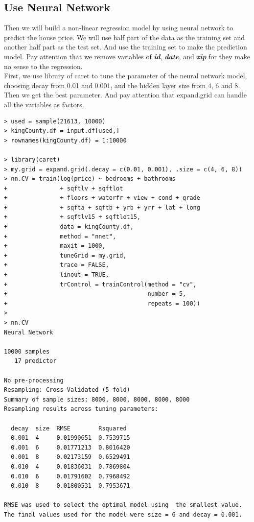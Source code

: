 \documentclass{article}%
\begin{document}
\subsection{Use Neural Network}
Then we will build a non-linear regression model by using neural network to predict the house price. We will use half part of the data as the training set and another half part as the test set. And use the training set to make the prediction model. Pay attention that we remove variables of  \emph{\textbf{id}},  \emph{\textbf{date}},  and \emph{\textbf{zip}} for they make no sense to the regression.\\
\indent First, we use library of caret to tune the parameter of the neural network model, choosing decay from 0.01 and 0.001, and the hidden layer size from 4, 6 and 8. Then we get the best parameter. And pay attention that expand.grid can handle all the variables as factors.
\begin{verbatim}
> used = sample(21613, 10000)
> kingCounty.df = input.df[used,]
> rownames(kingCounty.df) = 1:10000

> library(caret)
> my.grid = expand.grid(.decay = c(0.01, 0.001), .size = c(4, 6, 8))
> nn.CV = train(log(price) ~ bedrooms + bathrooms
+               + sqftlv + sqftlot
+               + floors + waterfr + view + cond + grade
+               + sqfta + sqftb + yrb + yrr + lat + long
+               + sqftlv15 + sqftlot15,
+               data = kingCounty.df,
+               method = "nnet",
+               maxit = 1000,
+               tuneGrid = my.grid,
+               trace = FALSE,
+               linout = TRUE,
+               trControl = trainControl(method = "cv",
+                                        number = 5,
+                                        repeats = 100))
>
> nn.CV
Neural Network

10000 samples
   17 predictor

No pre-processing
Resampling: Cross-Validated (5 fold)
Summary of sample sizes: 8000, 8000, 8000, 8000, 8000
Resampling results across tuning parameters:

  decay  size  RMSE        Rsquared
  0.001  4     0.01990651  0.7539715
  0.001  6     0.01771213  0.8016420
  0.001  8     0.02173159  0.6529491
  0.010  4     0.01836031  0.7869804
  0.010  6     0.01791602  0.7968492
  0.010  8     0.01800531  0.7953671

RMSE was used to select the optimal model using  the smallest value.
The final values used for the model were size = 6 and decay = 0.001.
\end{verbatim}
\end{document}
